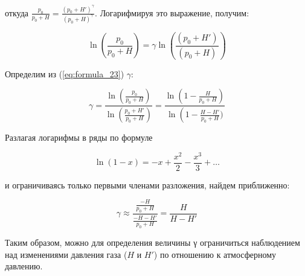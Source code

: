 откуда $\frac{p_0}{p_0 + H} = \frac{\left (p_0 + H' \right )^ \gamma}{\left (p_0 + H \right )^ \gamma}$. Логарифмируя это выражение, получим:

\begin{equation}
    \ln \left (\frac{p_0}{p_0 + H} \right ) = \gamma \ln \left (\frac{\left (p_0 + H' \right )}{\left (p_0 + H \right )} \right )
    \label{eq:formula_23}
\end{equation}

Определим из (\ref{eq:formula_23}) $\gamma$:

\begin{equation}
    \gamma = \frac{\ln \left (\frac{p_0}{p_0 + H} \right )}{\ln \left (\frac{p_0 + H'}{p_0 + H} \right )} = \frac{\ln \left (1 - \frac{H}{p_0 + H} \right )}{\ln \left (1 - \frac{H - H'}{p_0 + H})}
    \label{eq:formula_24}
\end{equation}

Разлагая логарифмы в ряды по формуле

\begin{equation}
    \ln \left (1 - x \right ) = -x + \frac{x^2}{2} - \frac{x^3}{3} + \dots
    \label{eq:formula_25}
\end{equation}

и ограничиваясь только первыми членами разложения, найдем приближенно: 

\begin{equation}
    \gamma \approx \frac{\frac{-H}{p_0 + H}}{\frac{-H - H'}{p_0 + H}} = \frac{H}{H - H'}
    \label{eq:formula_26}
\end{equation}


Таким образом, можно для определения величины γ ограничиться наблюдением над изменениями давления газа ($H$ и $H'$) по отношению к атмосферному давлению.

